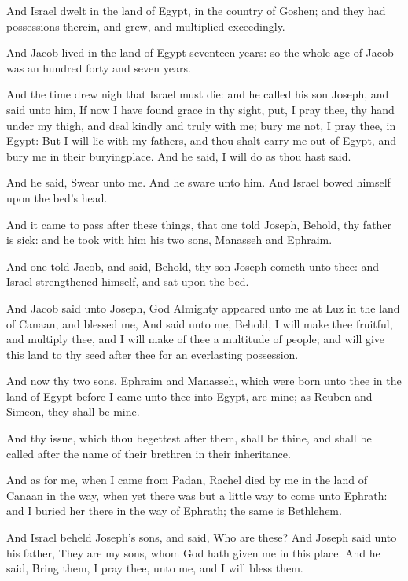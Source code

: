 \Verse And Israel dwelt in the land of Egypt, in the country of Goshen; and they had possessions therein, and grew, and multiplied exceedingly.

\Verse And Jacob lived in the land of Egypt seventeen years: so the whole age of Jacob was an hundred forty and seven years.

\Verse And the time drew nigh that Israel must die: and he called his son Joseph, and said unto him, If now I have found grace in thy sight, put, I pray thee, thy hand under my thigh, and deal kindly and truly with me; bury me not, I pray thee, in Egypt: \Verse But I will lie with my fathers, and thou shalt carry me out of Egypt, and bury me in their buryingplace. And he said, I will do as thou hast said.

\Verse And he said, Swear unto me. And he sware unto him. And Israel bowed himself upon the bed's head.

\Chapter
\Verse And it came to pass after these things, that one told Joseph, Behold, thy father is sick: and he took with him his two sons, Manasseh and Ephraim.

\Verse And one told Jacob, and said, Behold, thy son Joseph cometh unto thee: and Israel strengthened himself, and sat upon the bed.

\Verse And Jacob said unto Joseph, God Almighty appeared unto me at Luz in the land of Canaan, and blessed me, \Verse And said unto me, Behold, I will make thee fruitful, and multiply thee, and I will make of thee a multitude of people; and will give this land to thy seed after thee for an everlasting possession.

\Verse And now thy two sons, Ephraim and Manasseh, which were born unto thee in the land of Egypt before I came unto thee into Egypt, are mine; as Reuben and Simeon, they shall be mine.

\Verse And thy issue, which thou begettest after them, shall be thine, and shall be called after the name of their brethren in their inheritance.

\Verse And as for me, when I came from Padan, Rachel died by me in the land of Canaan in the way, when yet there was but a little way to come unto Ephrath: and I buried her there in the way of Ephrath; the same is Bethlehem.

\Verse And Israel beheld Joseph's sons, and said, Who are these?  \Verse And Joseph said unto his father, They are my sons, whom God hath given me in this place. And he said, Bring them, I pray thee, unto me, and I will bless them.

